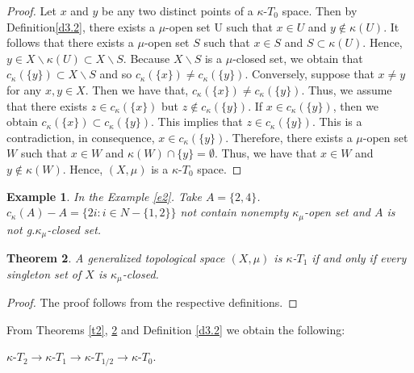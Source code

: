 \documentclass{matua}
\newtheorem{theorem}{Theorem}[section]
\newtheorem{example}[theorem]{Example}
\newtheorem{proposition}[theorem]{Proposition}
\begin{document}
\begin{proof}
Let $x$ and $y$ be any two distinct points of a $\kappa$-$T_0$ space. Then by Definition\ref{d3.2}, there exists a $\mu$-open set U such that $x\in U$ and $y\notin \kappa(U)$. It follows that there exists a $\mu$-open set $S$ such that $x \in S$ and $S \subset \kappa (U)$. Hence, $y \in X\backslash \kappa (U) \subset X\backslash S$. Because $X\backslash S$ is a $\mu$-closed set, we obtain that $c_\kappa(\{y\})\subset X\backslash S$ and so $c_\kappa(\{x\}) \neq c_\kappa(\{y\})$. Conversely, suppose that $x\neq y$ for any $x, y\in X$. Then we have that, $c_\kappa(\{x\}) \neq c_\kappa(\{y\})$. Thus, we assume that there exists $z\in  c_\kappa(\{x\})$ but $z \notin c_\kappa(\{y\})$. If $x \in c_\kappa(\{y\})$, then we obtain $c_\kappa(\{x\}) \subset c_\kappa(\{y\})$. This implies that $z \in c_\kappa(\{y\})$. This is a contradiction, in consequence, $x \in c_\kappa(\{y\})$. Therefore, there exists a $\mu$-open set $W$ such that $x \in W$ and $\kappa(W) \cap \{y\} = \emptyset$. Thus, we have that $x \in W$ and $y \notin \kappa(W)$. Hence, $(X, \mu)$ is a $\kappa$-$T_0$ space.
\end{proof}
\begin{example}\label{e5}
In the Example \ref{e2}. Take $A=\{2,4\}$. $c_{\kappa}(A)- A=\{2i:i\in N-\{1,2\}\}$ not contain nonempty $\kappa_\mu$-open set and $A$ is not g.$\kappa_\mu$-closed set.
\end{example}
\begin{theorem}\label{t1}
A generalized topological space $(X, \mu)$ is $\kappa$-$T_1$ if and only if every singleton set of $X$ is $\kappa_\mu$-closed.
\end{theorem}
\begin{proof}
The proof follows from the respective definitions.
\end{proof}
From Theorems \ref{t2}, \ref{t1} and Definition \ref{d3.2} we obtain the following:
\begin{center}
$\kappa$-$T_2\rightarrow\kappa$-$T_1\rightarrow\kappa$-$T_{1/2}\rightarrow\kappa$-$T_0$.
\end{center}
\end{document}
